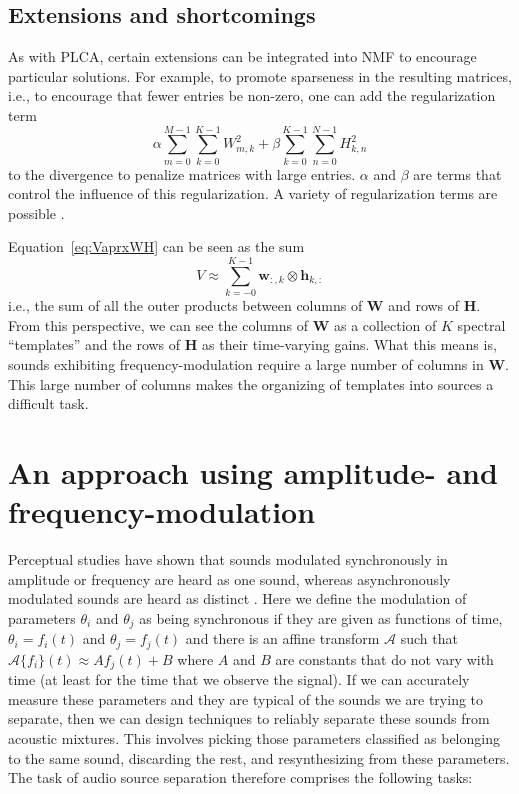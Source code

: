 \subsection{Extensions and shortcomings}

As with PLCA, certain extensions can be integrated into NMF to encourage
particular solutions. For example, to promote sparseness in the resulting
matrices, i.e., to encourage that fewer entries be non-zero, one can add the
regularization term
\[
    \alpha\sum_{m=0}^{M-1}\sum_{k=0}^{K-1} W_{m,k}^{2}
    +
    \beta\sum_{k=0}^{K-1}\sum_{n=0}^{N-1} H_{k,n}^{2}
\]
to the divergence to penalize matrices with large entries. $\alpha$ and $\beta$
are terms that control the influence of this regularization. A variety of
regularization terms are possible \cite[ch.~3]{cichocki2009nonnegative}.

Equation~\ref{eq:VaprxWH} can be seen as the sum
\[
    V
    \approx
    \sum_{k=-0}^{K-1}\boldsymbol{w}_{:,k}\otimes\boldsymbol{h}_{k,:}
\]
i.e., the sum of all the outer products between columns of $\boldsymbol{W}$ and
rows of $\boldsymbol{H}$. From this perspective, we can see the columns of
$\boldsymbol{W}$ as a collection of $K$ spectral ``templates'' and the rows of
$\boldsymbol{H}$ as their time-varying gains. What this means is, sounds
exhibiting frequency-modulation require a large number of columns in
$\boldsymbol{W}$. This large number of columns makes the organizing of
templates into sources a difficult task.

\section{An approach using amplitude- and frequency-modulation
\label{sec:amfmapproach}}

Perceptual studies have shown that sounds modulated synchronously in amplitude
or frequency are heard as one sound, whereas asynchronously modulated sounds are
heard as distinct \cite{mcadams1989segregation} \cite{marin1991segregation}.
Here we define the modulation of parameters $\theta_i$ and $\theta_j$ as being
synchronous if they are given as functions of time, $\theta_i=f_i(t)$ and
$\theta_j=f_j(t)$ and there is an affine transform $\mathscr{A}$ such that
$\mathscr{A}\{f_i\}(t) \approx A f_j(t) + B$ where $A$ and $B$ are constants
that do not vary with time (at least for the time that we observe the signal).
If we can accurately measure these parameters and they are typical of the sounds
we are trying to separate, then we can design techniques to reliably separate
these sounds from acoustic mixtures. This involves picking those parameters
classified as belonging to the same sound, discarding the rest, and
resynthesizing from these parameters. The task of audio source separation
therefore comprises the following tasks:

